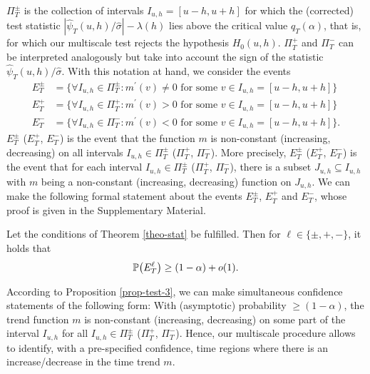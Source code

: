 $\Pi_T^\pm$ is the collection of intervals $I_{u,h} = [u-h,u+h]$ for which the (corrected) test statistic $|\widehat{\psi}_T(u,h)/\widehat{\sigma}| - \lambda(h)$ lies above the critical value $q_T(\alpha)$, that is, for which our multiscale test rejects the hypothesis $H_0(u,h)$. $\Pi_T^+$ and $\Pi_T^-$ can be interpreted analogously but take into account the sign of the statistic $\widehat{\psi}_T(u,h)/\widehat{\sigma}$. With this notation at hand, we consider the events 
\begin{align*}
E_T^\pm & = \Big\{ \forall I_{u,h} \in \Pi_T^\pm: m^\prime(v) \ne 0 \text{ for some } v \in I_{u,h} = [u-h,u+h] \Big\} \\
E_T^+  & = \Big\{ \forall I_{u,h} \in \Pi_T^+: m^\prime(v) > 0 \text{ for some } v \in I_{u,h} = [u-h,u+h] \Big\} \\
E_T^-  & = \Big\{ \forall I_{u,h} \in \Pi_T^-: m^\prime(v) < 0 \text{ for some } v \in I_{u,h} = [u-h,u+h] \Big\}.
\end{align*}
$E_T^\pm$ ($E_T^+$, $E_T^-$) is the event that the function $m$ is non-constant (increasing, decreasing) on all intervals $I_{u,h} \in \Pi_T^\pm$ ($\Pi_T^+$, $\Pi_T^-$). More precisely, $E_T^\pm$ ($E_T^+$, $E_T^-$) is the event that for each interval $I_{u,h} \in \Pi_T^\pm$ ($\Pi_T^+$, $\Pi_T^-$), there is a subset $J_{u,h} \subseteq I_{u,h}$ with $m$ being a non-constant (increasing, decreasing) function on $J_{u,h}$. We can make the following formal statement about the events $E_T^\pm$, $E_T^+$ and $E_T^-$, whose proof is given in the Supplementary Material. 
\begin{prop}\label{prop-test-3}
Let the conditions of Theorem \ref{theo-stat} be fulfilled. Then for $\ell \in \{ \pm,+,-\}$, it holds that
\[ \mathbb{P} \big( E_T^\ell \big) \ge (1-\alpha) + o(1). \]
\end{prop}
According to Proposition \ref{prop-test-3}, we can make simultaneous confidence statements of the following form: With (asymptotic) probability $\ge (1-\alpha)$, the trend function $m$ is non-constant (increasing, decreasing) on some part of the interval $I_{u,h}$ for all $I_{u,h} \in \Pi_T^\pm$ ($\Pi_T^+$, $\Pi_T^-$). Hence, our multiscale procedure allows to identify, with a pre-specified confidence, time regions where there is an increase/decrease in the time trend $m$. 


